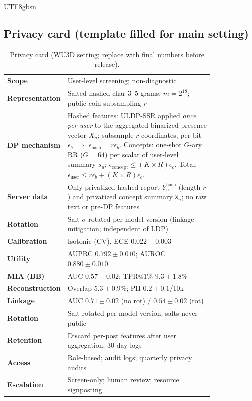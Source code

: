 \documentclass[acmsmall,natbib]{acmart}
\begin{document}
\begin{CJK*}{UTF8}{gbsn}
\subsection{Privacy card (template filled for main setting)}
\begin{table}[h]
\centering
\caption{Privacy card (WU3D setting; replace with final numbers before release).}
\label{tab:privacy-card}
\small
\begin{tabular}{@{}l p{0.82\linewidth}@{}}
\toprule
\textbf{Scope} & User-level screening; non-diagnostic \\
\textbf{Representation} & Salted hashed char 3–5-grams; $m{=}2^{18}$; public-coin subsampling $r$ \\
\textbf{DP mechanism} & Hashed features: ULDP-SSR applied \emph{once per user} to the aggregated binarized presence vector $X_u$; subsample $r$ coordinates, per-bit $\epsilon_b$ $\Rightarrow$ $\epsilon_{\text{hash}}{=}r\epsilon_b$. Concepts: one-shot $G$-ary RR ($G{=}64$) per scalar of user-level summary $s_u$; $\epsilon_{\text{concept}} \le (K\!\times\!R)\epsilon_c$. Total: $\epsilon_{\text{user}} \le r\epsilon_b + (K\!\times\!R)\epsilon_c$. \\
\textbf{Server data} & Only privatized hashed report $Y^{\text{hash}}_u$ (length $r$) and privatized concept summary $\hat{s}_u$; no raw text or pre-DP features \\
\textbf{Rotation} & Salt $\sigma$ rotated per model version (linkage mitigation; independent of LDP) \\
\textbf{Calibration} & Isotonic (CV), ECE $0.022{\pm}0.003$ \\
\textbf{Utility} & AUPRC $0.792{\pm}0.010$; AUROC $0.880{\pm}0.010$ \\
\textbf{MIA (BB)} & AUC $0.57{\pm}0.02$; TPR@1\% $9.3{\pm}1.8\%$ \\
\textbf{Reconstruction} & Overlap $5.3{\pm}0.9\%$; PII $0.2{\pm}0.1$/10k \\
\textbf{Linkage} & AUC $0.71{\pm}0.02$ (no rot) / $0.54{\pm}0.02$ (rot) \\
\textbf{Rotation} & Salt rotated per model version; salts never public \\
\textbf{Retention} & Discard per-post features after user aggregation; 30\mbox{-}day logs \\
\textbf{Access} & Role\mbox{-}based; audit logs; quarterly privacy audits \\
\textbf{Escalation} & Screen\mbox{-}only; human review; resource signposting \\
\bottomrule
\end{tabular}
\end{table}


\end{CJK*}
\end{document}
